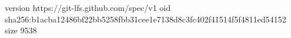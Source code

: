 version https://git-lfs.github.com/spec/v1
oid sha256:b1acba12486bf22bb5258fbb31cee1e7138d8c3fc402f41514f5f4811ed54152
size 9538
